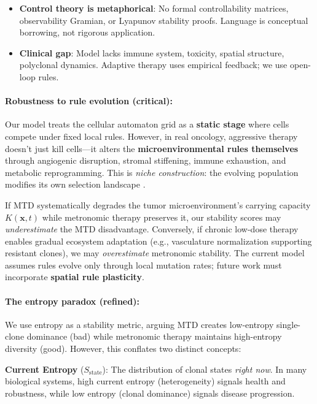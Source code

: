 \documentclass[11pt,a4paper]{article}
\begin{document}
\begin{itemize}
    \item \textbf{Control theory is metaphorical}: No formal controllability matrices, observability Gramian, or Lyapunov stability proofs. Language is conceptual borrowing, not rigorous application.
    \item \textbf{Clinical gap}: Model lacks immune system, toxicity, spatial structure, polyclonal dynamics. Adaptive therapy uses empirical feedback; we use open-loop rules.
\end{itemize}

\paragraph{Robustness to rule evolution (critical):}
Our model treats the cellular automaton grid as a \textbf{static stage} where cells compete under fixed local rules. However, in real oncology, aggressive therapy doesn't just kill cells---it alters the \textbf{microenvironmental rules themselves} through angiogenic disruption, stromal stiffening, immune exhaustion, and metabolic reprogramming. This is \textit{niche construction}: the evolving population modifies its own selection landscape \citep{laland2016niche}.

If MTD systematically degrades the tumor microenvironment's carrying capacity $K(\mathbf{x}, t)$ while metronomic therapy preserves it, our stability scores may \textit{underestimate} the MTD disadvantage. Conversely, if chronic low-dose therapy enables gradual ecosystem adaptation (e.g., vasculature normalization supporting resistant clones), we may \textit{overestimate} metronomic stability. The current model assumes rules evolve only through local mutation rates; future work must incorporate \textbf{spatial rule plasticity}.

\paragraph{The entropy paradox (refined):}
We use entropy as a stability metric, arguing MTD creates low-entropy single-clone dominance (bad) while metronomic therapy maintains high-entropy diversity (good). However, this conflates two distinct concepts:

\textbf{Current Entropy} ($S_{\text{state}}$): The distribution of clonal states \textit{right now}. In many biological systems, high current entropy (heterogeneity) signals health and robustness, while low entropy (clonal dominance) signals disease progression.
\end{document}
